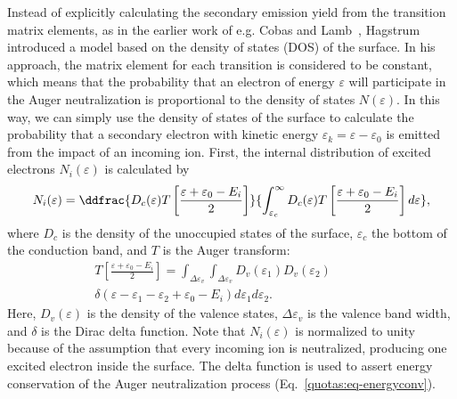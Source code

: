 \begin{refsection}
Instead of explicitly calculating the secondary emission yield from the transition matrix elements, as in the earlier work of e.g. Cobas and Lamb~\cite{Cobas1944}, Hagstrum introduced a model based on the density of states (DOS) of the surface. In his approach, the matrix element for each transition is considered to be constant, which means that the probability that an electron of energy $\varepsilon$ will participate in the Auger neutralization is proportional to the density of states $N(\varepsilon)$. In this way, we can simply use the density of states of the surface to calculate the probability that a secondary electron with kinetic energy $\varepsilon_k = \varepsilon - \varepsilon_0$ is emitted from the impact of an incoming ion. First, the internal distribution of excited electrons $N_i(\varepsilon)$ is calculated by
\begin{equation} \label{quotas:eq-excite}
N_i(\varepsilon) = \ddfrac{D_c(\varepsilon)T\left[\frac{\varepsilon + \varepsilon_0 - E_i}{2}\right]}{\int_{\varepsilon_c}^\infty D_c (\varepsilon)T\left[\frac{\varepsilon + \varepsilon_0 - E_i}{2}\right]d\varepsilon},
\end{equation}
where $D_c$ is the density of the unoccupied states of the surface, $\varepsilon_c$ the bottom of the conduction band, and $T$ is the Auger transform:
\begin{equation}
\begin{aligned}
T\left[\frac{\varepsilon + \varepsilon_0 - E_i}{2}\right] = \int_{\Delta\varepsilon_v}\int_{\Delta\varepsilon_v} D_v (\varepsilon_1) D_v (\varepsilon_2) \hspace{3em} \\ \delta(\varepsilon - \varepsilon_1 - \varepsilon_2 + \varepsilon_0 - E_i) d\varepsilon_1 d\varepsilon_2.
\end{aligned}
\end{equation}
Here, $D_v(\varepsilon)$ is the density of the valence states, $\Delta\varepsilon_v$ is the valence band width, and $\delta$ is the Dirac delta function. Note that $N_i(\varepsilon)$ is normalized to unity because of the assumption that every incoming ion is neutralized, producing one excited electron inside the surface. The delta function is used to assert energy conservation of the Auger neutralization process (Eq.~\ref{quotas:eq-energyconv}). \\


\end{refsection}
